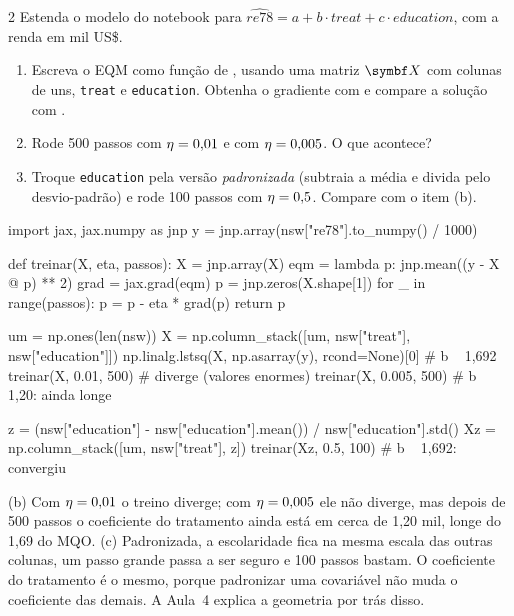 \documentclass[lista]{tmlnotas}
\begin{document}
\begin{exercicio}{2}
Estenda o modelo do notebook para
$\widehat{re78} = a + b\cdot treat + c\cdot education$, com a renda em mil US\$.
\begin{enumerate}[label=(\alph*)]
  \item Escreva o EQM como função de , usando
        uma matriz $\mX$ com colunas de uns, \texttt{treat} e \texttt{education}.
        Obtenha o gradiente com  e compare a solução com
        .
  \item Rode 500 passos com $\eta = 0{,}01$ e com $\eta = 0{,}005$. O que acontece?
  \item Troque \texttt{education} pela versão \emph{padronizada} (subtraia a
        média e divida pelo desvio-padrão) e rode 100 passos com $\eta = 0{,}5$.
        Compare com o item (b).
\end{enumerate}
\end{exercicio}
\begin{solucao}
\begin{codigo}
import jax, jax.numpy as jnp
y = jnp.array(nsw["re78"].to_numpy() / 1000)

def treinar(X, eta, passos):
    X = jnp.array(X)
    eqm = lambda p: jnp.mean((y - X @ p) ** 2)
    grad = jax.grad(eqm)
    p = jnp.zeros(X.shape[1])
    for _ in range(passos):
        p = p - eta * grad(p)
    return p

um = np.ones(len(nsw))
X = np.column_stack([um, nsw["treat"], nsw["education"]])
np.linalg.lstsq(X, np.asarray(y), rcond=None)[0]   # b ~ 1,692
treinar(X, 0.01, 500)      # diverge (valores enormes)
treinar(X, 0.005, 500)     # b ~ 1,20: ainda longe

z = (nsw["education"] - nsw["education"].mean()) / nsw["education"].std()
Xz = np.column_stack([um, nsw["treat"], z])
treinar(Xz, 0.5, 100)      # b ~ 1,692: convergiu
\end{codigo}
(b) Com $\eta = 0{,}01$ o treino diverge; com $\eta = 0{,}005$ ele não diverge,
mas depois de 500 passos o coeficiente do tratamento ainda está em cerca de 1,20
mil, longe do 1,69 do MQO. (c) Padronizada, a escolaridade fica na mesma escala
das outras colunas, um passo grande passa a ser seguro e 100 passos bastam.
O coeficiente do tratamento é o mesmo, porque padronizar uma covariável não muda
o coeficiente das demais. A Aula~4 explica a geometria por trás disso.
\end{solucao}
\end{document}
